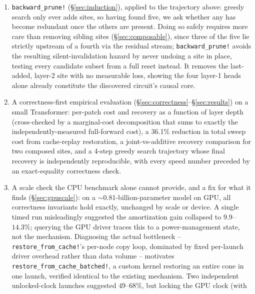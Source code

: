 \documentclass{article}
\begin{document}
\begin{enumerate}
    reaching $99.94\%$ of the causal effect, and the two heads it finds first are independently
    confirmed, by inspecting attention patterns the search never examined, to attend almost
    entirely to the exact token position the induction algorithm must copy from.
    \item \texttt{backward\_prune!} (\S\ref{sec:induction}), applied to the trajectory above:
    greedy search only ever adds sites, so having found five, we ask whether any has become
    redundant once the others are present. Doing so safely requires more care than removing
    sibling sites (\S\ref{sec:composable}), since three of the five lie strictly upstream of a
    fourth via the residual stream; \texttt{backward\_prune!} avoids the resulting
    silent-invalidation hazard by never undoing a site in place, testing every candidate subset
    from a full reset instead. It removes the last-added, layer-2 site with no measurable loss,
    showing the four layer-1 heads alone already constitute the discovered circuit's causal core.
    \item A correctness-first empirical evaluation (\S\ref{sec:correctness}--\S\ref{sec:results})
    on a small Transformer: per-patch cost and recovery as a function of layer depth (cross-checked
    by a marginal-cost decomposition that sums to exactly the independently-measured full-forward
    cost), a 36.1\% reduction in total sweep cost from cache-replay restoration, a joint-vs-additive
    recovery comparison for two composed sites, and a 4-step greedy search trajectory whose final
    recovery is independently reproducible, with every speed number preceded by an
    exact-equality correctness check.
    \item A scale check the CPU benchmark alone cannot provide, and a fix for what it finds
    (\S\ref{sec:gpuscale}): on a $\sim$0.81-billion-parameter model on GPU, all correctness
    invariants hold exactly, unchanged by scale or device. A single timed run misleadingly
    suggested the amortization gain collapsed to $9.9$--$14.3\%$; querying the GPU driver traces
    this to a power-management state, not the mechanism. Diagnosing the actual bottleneck --
    \texttt{restore\_from\_cache!}'s per-node copy loop, dominated by fixed per-launch driver
    overhead rather than data volume -- motivates \texttt{restore\_from\_cache\_batched!}, a custom
    kernel restoring an entire cone in one launch, verified identical to the existing mechanism.
    Two independent unlocked-clock launches suggested $49$--$68\%$, but locking the GPU clock (with

\end{enumerate}
\end{document}
